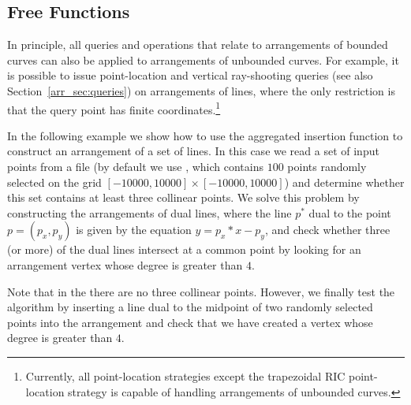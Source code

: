
\subsection{Free Functions\label{arr_ssec:unb_global}}

In principle, all queries and operations that relate to arrangements
of bounded curves can also be applied to arrangements of unbounded
curves. For example, it is possible to issue point-location and
vertical ray-shooting queries (see also Section~\ref{arr_sec:queries})
on arrangements of lines, where the only restriction is that the query
point has finite coordinates.\footnote{Currently, all point-location
strategies except the trapezoidal RIC point-location strategy is
capable of handling arrangements of unbounded curves.} 

In the following example we show how to use the aggregated insertion
function to construct an arrangement of a set of lines. In this
case we read a set of input points from a file (by default we use
, which contains $100$ points randomly selected
on the grid $[-10000,10000]\times[-10000,10000]$) and determine
whether this set contains at least three collinear points. We solve
this problem by constructing the arrangements of dual lines, where
the line $p^{*}$ dual to the point $p = (p_x, p_y)$ is given by
the equation $y = p_x*x - p_y$, and check whether three (or more)
of the dual lines intersect at a common point by looking for an
arrangement vertex whose degree is greater than $4$. 


Note that in the  there are no three collinear points.
However, we finally test the algorithm by inserting a line dual to the
midpoint of two randomly selected points into the arrangement and
check that we have created a vertex whose degree is greater than $4$.

